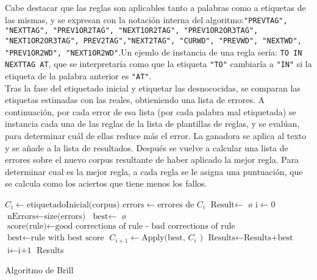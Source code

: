 Cabe destacar que las reglas son aplicables tanto a palabras como a etiquetas de las mismas, y se expresan con la notación interna del algoritmo:\newline \texttt{"PREVTAG", "NEXTTAG", "PREV1OR2TAG", "NEXT1OR2TAG", "PREV1OR2OR3TAG", "NEXT1OR2OR3TAG", PREV2TAG","NEXT2TAG",
 "CURWD", "PREVWD", "NEXTWD", "PREV1OR2WD", "NEXT1OR2WD"}.\newline Un ejemlo de instancia de una regla sería: \textcolor{SchoolColor}{\texttt{TO IN NEXTTAG AT}}, que se interpretaría como que la etiqueta \texttt{"TO"} cambiaría a \texttt{"IN"} si la etiqueta de la palabra anterior es \texttt{"AT"}. \\[\baselineskip]
 Tras la fase del etiquetado inicial y etiquetar las desnococidas, se comparan las etiquetas estimadas con las reales, obtieniendo una lista de errores. A continuación, por cada error de esa lista (por cada palabra mal etiquetada) se instancia cada una de las reglas de la lista de plantillas de reglas, y se evalúan, para determinar cuál de ellas reduce más el error. La ganadora se aplica al texto y se añade a la lista de resultados. Después se vuelve a calcular una lista de errores sobre el nuevo corpus resultante de haber aplicado la mejor regla. \newline
 Para determinar cual es la mejor regla, a cada regla se le asigna una puntuación, que se calcula como   
 los aciertos que tiene menos los fallos.    


\begin{algorithm}[H]
    \begin{algorithmic}[1]
    \State $\text{$C_{i}$} \gets \text{etiquetadoInicial(corpus)}$
\State $\text{errors} \gets \text{errores de $C_{i}$}$
\State $\text{Result} \gets$ \o
\State $\text{i} \gets 0$
\State $\text{nErrors} \gets \text{size(errors)}$
\State $\text{best}  \gets$ \o
{} 
            \State $\text{score(rule)} \gets \text{good corrections of rule - bad corrections of rule}$ 
            \EndFor
        \EndFor
        \State $\text{best} \gets \text{rule with best score}$
		\State $\text{$C_{i+1}$} \gets \text{Apply(best, $C_{i}$ )}$
		\State $\text{Results} \gets \text{Results+best}$
		\State $\text{i} \gets \text{i+1}$
        \EndWhile
        \EndProcedure
        \BState \Return Results
    \end{algorithmic}
    \label{alg:rAP}
    \caption{Algoritmo de Brill}
\end{algorithm}

